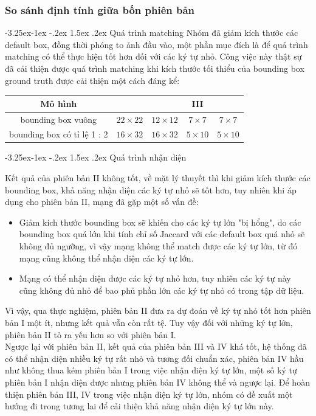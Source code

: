 \documentclass[a4paper]{article}
\makeatletter
\theoremstyle{definition}
\newcounter {subsubsubsection}[subsubsection]
\newcommand\subsubsubsection{\@startsection{subsubsubsection}{4}{\z@}%
	{-3.25ex\@plus -1ex \@minus -.2ex}%
	{1.5ex \@plus .2ex}%
	{\normalfont\normalsize\bfseries}}
\makeatother
\begin{document}
	
	\subsubsection{So sánh định tính giữa bốn phiên bản}
	\subsubsubsection{Quá trình matching}
	Nhóm đã giảm kích thước các default box, đồng thời phóng to ảnh đầu vào, một phần mục đích là để quá trình matching có thể thực hiện tốt hơn đối với các ký tự nhỏ. Công việc này thật sự đã cải thiện được quá trình matching khi kích thước tối thiểu của bounding box ground truth được cải thiện một cách đáng kể:
	
	\begin{center}
		\begin{tabular}{||c | c | c | c | c||} 
			\hline
			Mô hình & \makecell{  I } & \makecell{ II} & III &  \makecell{ IV}  \\ [0.5ex] 
			\hline
			bounding box vuông & $22 \times 22$ & $12 \times 12$ & $7 \times 7$ & $7 \times 7$ \\
			\hline
			bounding box có tỉ lệ 1 : 2 & $16 \times 32$ & $16 \times 32$ & $5 \times 10$ & $5 \times 10$ \\
			\hline
		\end{tabular}
	\end{center}
	
	\subsubsubsection{Quá trình nhận diện}
	
	Kết quả của phiên bản II không tốt, về mặt lý thuyết thì khi giảm kích thước các bounding box, khả năng nhận diện các ký tự nhỏ sẽ tốt hơn, tuy nhiên khi áp dụng cho phiên bản II, mạng đã gặp một số vấn đề: 
	
	\begin{itemize}
		\item Giảm kích thước bounding box sẽ khiến cho các ký tự lớn "bị hổng", do các bounding box quá lớn khi tính chỉ số Jaccard\cite{Jaccard} với các default box quá nhỏ sẽ không đủ ngưỡng, vì vậy mạng không thể match được các ký tự lớn, từ đó mạng cũng không thể nhận diện các ký tự lớn.
		\item Mạng có thể nhận diện được các ký tự nhỏ hơn, tuy nhiên các ký tự này cũng không đủ nhỏ để bao phủ phần lớn các ký tự nhỏ có trong tập dữ liệu.
	\end{itemize}
	Vì vậy, qua thực nghiệm, phiên bản II đưa ra dự đoán về ký tự nhỏ tốt hơn phiên bản I một ít, nhưng kết quả vẫn còn rất tệ. Tuy vậy đối với những ký tự lớn, phiên bản II tỏ ra yếu hơn so với phiên bản I.\\
	Ngược lại với phiên bản II, kết quả của phiên bản III và IV khá tốt, hệ thống đã có thể nhận diện nhiều ký tự rất nhỏ và tương đối chuẩn xác, phiên bản IV hầu như không thua kém phiên bản I trong việc nhận diện ký tự lớn, một số ký tự phiên bản I nhận diện được nhưng phiên bản IV không thể và ngược lại. Để hoàn thiện phiên bản III, IV trong việc nhận diện ký tự lớn, nhóm có đề xuất một hướng đi trong tương lai để cải thiện khả năng nhận diện ký tự lớn này.\\
	
\end{document}
